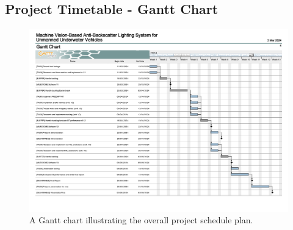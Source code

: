 \documentclass[12pt]{article}
\begin{document}
\newpage
\begin{appendices}
        \section{Project Timetable - Gantt Chart}
        \label{appendix:gantt_chart}
        \begin{figure}[h]
            \centering
            \includegraphics[width=1\textwidth]{assets/gantt_chart.png}
            \caption{A Gantt chart illustrating the overall project schedule plan.}
            \label{fig:gantt_chart}
        \end{figure}
\end{appendices}


\newpage


\end{document}
